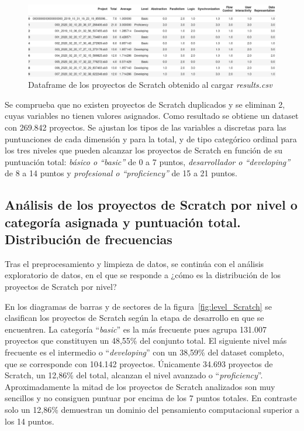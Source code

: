 \documentclass[a4paper, 12pt]{book}
\begin{document}
\begin{figure}[H]
    \centering
    \includegraphics[width=1.0\textwidth]{img/df_origen_Scratch.png}
    \caption{Dataframe de los proyectos de Scratch obtenido al cargar \emph{results.csv}}\label{fig:df_Scratch}
\end{figure}

Se comprueba que no existen proyectos de Scratch duplicados y se eliminan 2, cuyas variables no tienen valores asignados. Como resultado se obtiene un dataset con 269.842 proyectos. Se ajustan los tipos de las variables a discretas para las puntuaciones de cada dimensión y para la total, y de tipo categórico ordinal para los tres niveles que pueden alcanzar los proyectos de Scratch en función de su puntuación total: \emph{ básico o ``basic''} de 0 a 7 puntos, \emph{desarrollador o ``developing''} de 8 a 14 puntos y \emph{profesional o ``proficiency''} de 15 a 21 puntos. %

\subsection{Análisis de los proyectos de Scratch por nivel o categoría asignada y puntuación total. Distribución de frecuencias}
\label{subsec:frec_nivel}

Tras el preprocesamiento y limpieza de datos, se continúa con el análisis exploratorio de datos, en el que se responde a ¿cómo es la distribución de los proyectos de Scratch por nivel? 

En los diagramas de barras y de sectores de la figura~\ref{fig:level_Scratch} se clasifican los proyectos de Scratch según la etapa de desarrollo en que se encuentren. La categoría ``\emph{basic}'' es la más frecuente pues agrupa 131.007 proyectos que constituyen un 48,55\% del conjunto total. El siguiente nivel más frecuente es el intermedio o ``\emph{developing}'' con un 38,59\% del dataset completo, que se corresponde con 104.142 proyectos. Únicamente 34.693 proyectos de Scratch, un 12,86\% del total, alcanzan el nivel avanzado o ``\emph{proficiency}''. Aproximadamente la mitad de los proyectos de Scratch analizados son muy sencillos y no consiguen puntuar por encima de los 7 puntos totales. En contraste solo un 12,86\% demuestran un dominio del pensamiento computacional superior a los 14 puntos.
\end{document}
